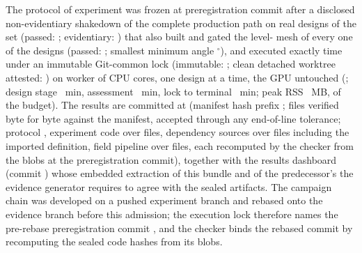 The protocol of experiment \texttt{\HmcExperimentId} was frozen at preregistration commit
\texttt{\HmcPreregCommit} after a disclosed non-evidentiary shakedown of the complete
production path on \HmcShakedownDesigns{} real designs of the set (passed:
\HmcShakedownPassed; evidentiary: \HmcShakedownEvidentiary) that also built and gated the
level-\HmcLevelZeroToken{} mesh of every one of the \HmcPreflightDesigns{} designs (passed:
\HmcPreflightPassed; smallest minimum angle \HmcPreflightMinAngleDeg$^\circ$), and executed
exactly \HmcAttemptCount{} time under an immutable Git-common lock (immutable:
\HmcLockImmutable; clean detached worktree attested: \HmcCleanWorktree) on \HmcWorkerPool{}
worker of \HmcCpuCount{} CPU cores, one design at a time, the GPU untouched
(\texttt{\HmcDevice}; design stage \HmcStageWallMin~min, assessment \HmcAssessmentWallMin~min,
lock to terminal \HmcExecutionWallMin~min; peak RSS \HmcPeakRssMb~MB, \HmcRamFractionUsed{} of
the budget). The results are committed at \texttt{\HmcResultsCommit} (manifest hash prefix
\texttt{\HmcManifestSha}; \HmcVerifiedFiles{} files verified byte for byte against the
manifest, \HmcToleratedEolFiles{} accepted through any end-of-line tolerance; protocol
\texttt{\HmcProtocolSha}, experiment code \texttt{\HmcExperimentCodeSha} over
\HmcExperimentCodeFiles{} files, dependency sources \texttt{\HmcDependencySourceSha} over
\HmcDependencySourceFiles{} files including the imported definition, field pipeline
\texttt{\HmcFieldPipelineSha} over \HmcFieldPipelineFiles{} files, each recomputed by the
checker from the blobs at the preregistration commit), together with the results dashboard
(commit \texttt{\HmcDashboardCommit}) whose embedded extraction of this bundle and of the
predecessor's the evidence generator requires to agree with the sealed artifacts. The
campaign chain was developed on a pushed experiment branch and rebased onto the evidence
branch before this admission; the execution lock therefore names the pre-rebase
preregistration commit \texttt{\HmcLockCommit}, and the checker binds the rebased commit by
recomputing the sealed code hashes from its blobs.

